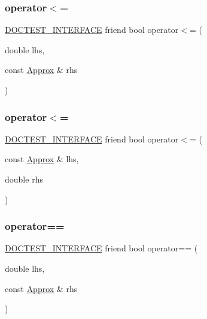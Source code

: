 \subsubsection{\texorpdfstring{operator$<$=}{operator<=}\hspace{0.1cm}{\footnotesize\ttfamily [1/2]}}
{\footnotesize\ttfamily \mbox{\hyperlink{doctest_8h_a9c16ffc635ec47f07797d21ede26b1a5}{D\+O\+C\+T\+E\+S\+T\+\_\+\+I\+N\+T\+E\+R\+F\+A\+CE}} friend bool operator$<$= (\begin{DoxyParamCaption}\item[{double}]{lhs,  }\item[{const \mbox{\hyperlink{classdoctest_1_1_approx}{Approx}} \&}]{rhs }\end{DoxyParamCaption})\hspace{0.3cm}{\ttfamily [friend]}}

\mbox{\label{classdoctest_1_1_approx_a7f32e572caa5ee152b8ade301fcfd838}} 
\subsubsection{\texorpdfstring{operator$<$=}{operator<=}\hspace{0.1cm}{\footnotesize\ttfamily [2/2]}}
{\footnotesize\ttfamily \mbox{\hyperlink{doctest_8h_a9c16ffc635ec47f07797d21ede26b1a5}{D\+O\+C\+T\+E\+S\+T\+\_\+\+I\+N\+T\+E\+R\+F\+A\+CE}} friend bool operator$<$= (\begin{DoxyParamCaption}\item[{const \mbox{\hyperlink{classdoctest_1_1_approx}{Approx}} \&}]{lhs,  }\item[{double}]{rhs }\end{DoxyParamCaption})\hspace{0.3cm}{\ttfamily [friend]}}

\mbox{\label{classdoctest_1_1_approx_a2b6b56551f113fd12f4a52b4d3e5fd7e}} 
\subsubsection{\texorpdfstring{operator==}{operator==}\hspace{0.1cm}{\footnotesize\ttfamily [1/2]}}
{\footnotesize\ttfamily \mbox{\hyperlink{doctest_8h_a9c16ffc635ec47f07797d21ede26b1a5}{D\+O\+C\+T\+E\+S\+T\+\_\+\+I\+N\+T\+E\+R\+F\+A\+CE}} friend bool operator== (\begin{DoxyParamCaption}\item[{double}]{lhs,  }\item[{const \mbox{\hyperlink{classdoctest_1_1_approx}{Approx}} \&}]{rhs }\end{DoxyParamCaption})\hspace{0.3cm}{\ttfamily [friend]}}

